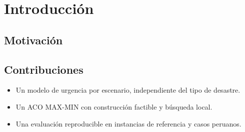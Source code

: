\chapter{Introducción}\label{cap:introduccion}

\section{Motivación}

\section{Contribuciones}
\begin{itemize}
  \item Un modelo de urgencia por escenario, independiente del tipo de desastre.
  \item Un ACO MAX-MIN \parencite{stutzle2000mmas} con construcción factible y búsqueda local.
  \item Una evaluación reproducible en instancias de referencia y casos peruanos.
\end{itemize}
